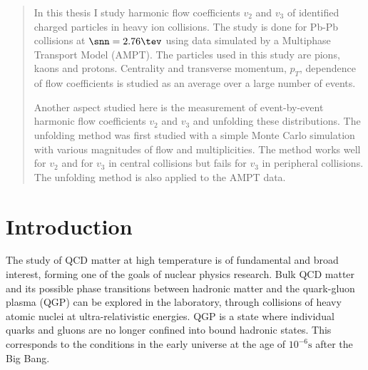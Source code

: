 

\begin{abstract}
In this thesis I study harmonic flow coefficients $v_2$ and $v_3$ of identified charged particles in heavy ion collisions. The study is done for Pb-Pb collisions at $\snn = 2.76\tev$ using data simulated by a Multiphase Transport Model (AMPT). The particles used in this study are pions, kaons and protons. Centrality and transverse momentum, $p_T$, dependence of flow coefficients is studied as an average over a large number of events.

Another aspect studied here is the measurement of event-by-event harmonic flow coefficients $v_2$ and $v_3$ and unfolding these distributions. The unfolding method was first studied with a simple Monte Carlo simulation with various magnitudes of flow and multiplicities. The method works well for $v_2$ and for $v_3$ in central collisions but fails for $v_3$ in peripheral collisions. The unfolding method is also applied to the AMPT data.
\end{abstract}
\tableofcontents

\clearpage
\section{Introduction}
The study of QCD matter at high temperature is of fundamental and broad interest, forming one of the goals of nuclear physics research. Bulk QCD matter and its possible phase transitions between hadronic matter and the quark-gluon plasma (QGP) can be explored in the laboratory, through collisions of heavy atomic nuclei at ultra-relativistic energies. QGP is a state where individual quarks and gluons are no longer confined into bound hadronic states. This corresponds to the conditions in the early universe at the age of $10^{-6}\mathrm{s}$ after the Big Bang.

